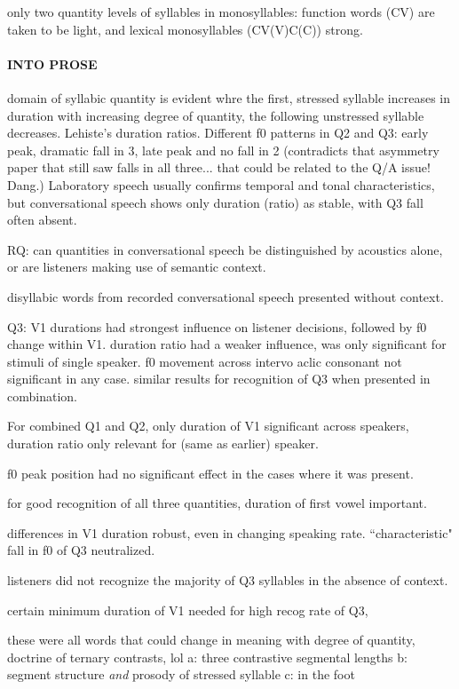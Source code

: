 only two quantity levels of syllables in monosyllables: function words (CV) are taken to be light, and lexical monosyllables (CV(V)C(C)) strong.

\paragraph{INTO PROSE}
domain of syllabic quantity is evident whre the first, stressed syllable increases in duration with increasing degree of quantity, the following unstressed syllable decreases. 
Lehiste's duration ratios. 
Different f0 patterns in Q2 and Q3: early peak, dramatic fall in 3, late peak and no fall in 2 (contradicts that asymmetry paper that still saw falls in all three... that could be related to the Q/A issue! Dang.)
Laboratory speech usually confirms temporal and tonal characteristics, but conversational speech shows only duration (ratio) as stable, with Q3 fall often absent. 

RQ: can quantities in conversational speech be distinguished by acoustics alone, or are listeners making use of semantic context. 

disyllabic words from recorded conversational speech presented without context. 

Q3: V1 durations had strongest influence on listener decisions, followed by f0 change within V1. duration ratio had a weaker influence, was only significant for stimuli of single speaker. f0 movement across intervo aclic consonant not significant in any case. similar results for recognition of Q3 when presented in combination.

For combined Q1 and Q2, only duration of V1 significant across speakers, duration ratio only relevant for (same as earlier) speaker. 

f0 peak position had no significant effect in the cases where it was present. 

for good recognition of all three quantities, duration of first vowel important. 

differences in V1 duration robust, even in changing speaking rate. ``characteristic" fall in f0 of Q3 neutralized. 

 listeners did not recognize the majority of Q3 syllables in the absence of context. 
 
 certain minimum duration of V1 needed for high recog rate of Q3, 
 
 these were all words that could change in meaning with degree of quantity,
\citep{krullUralica98} 
doctrine of ternary contrasts, lol 
a: three contrastive segmental lengths
b: segment structure {\it and} prosody of stressed syllable
c: in the foot

